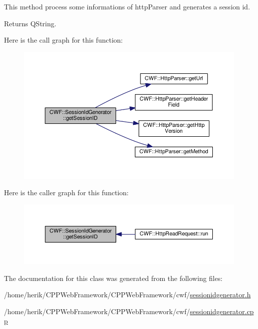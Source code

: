 This method process some informations of http\+Parser and generates a session id. 

\begin{DoxyReturn}{Returns}
Q\+String. 
\end{DoxyReturn}


Here is the call graph for this function\+:
\nopagebreak
\begin{figure}[H]
\begin{center}
\leavevmode
\includegraphics[width=350pt]{class_c_w_f_1_1_session_id_generator_a8aada44d07a73e07c4172725519c64f9_cgraph}
\end{center}
\end{figure}




Here is the caller graph for this function\+:
\nopagebreak
\begin{figure}[H]
\begin{center}
\leavevmode
\includegraphics[width=350pt]{class_c_w_f_1_1_session_id_generator_a8aada44d07a73e07c4172725519c64f9_icgraph}
\end{center}
\end{figure}




The documentation for this class was generated from the following files\+:\begin{DoxyCompactItemize}
\item 
/home/herik/\+C\+P\+P\+Web\+Framework/\+C\+P\+P\+Web\+Framework/cwf/\hyperlink{sessionidgenerator_8h}{sessionidgenerator.\+h}\item 
/home/herik/\+C\+P\+P\+Web\+Framework/\+C\+P\+P\+Web\+Framework/cwf/\hyperlink{sessionidgenerator_8cpp}{sessionidgenerator.\+cpp}\end{DoxyCompactItemize}
